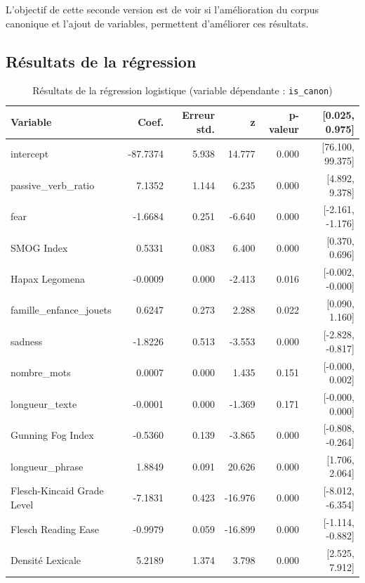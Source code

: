 \documentclass[12pt,a4paper,oneside,titlepage]{book} %
\begin{document}
L'objectif de cette seconde version est de voir si l'amélioration du corpus canonique et l'ajout de variables, permettent d'améliorer ces résultats.


\subsection{Résultats de la régression}




\begin{table}[htbp]
\centering
\caption{Résultats de la régression logistique (variable dépendante : \texttt{is\_canon})}
\begin{tabular}{lrrrrr}
\toprule
\textbf{Variable} & \textbf{Coef.} & \textbf{Erreur std.} & \textbf{z} & \textbf{p-valeur} & \textbf{[0.025, 0.975]} \\
\midrule
intercept                        & -87.7374 & 5.938  & 14.777 & 0.000 & [76.100, 99.375] \\
passive\_verb\_ratio         & 7.1352  & 1.144  & 6.235  & 0.000 & [4.892, 9.378] \\
fear                         & -1.6684 & 0.251  & -6.640 & 0.000 & [-2.161, -1.176] \\
SMOG Index                   & 0.5331  & 0.083  & 6.400  & 0.000 & [0.370, 0.696] \\
Hapax Legomena               & -0.0009 & 0.000  & -2.413 & 0.016 & [-0.002, -0.000] \\
famille\_enfance\_jouets     & 0.6247  & 0.273  & 2.288  & 0.022 & [0.090, 1.160] \\
sadness                      & -1.8226 & 0.513  & -3.553 & 0.000 & [-2.828, -0.817] \\
nombre\_mots                 & 0.0007  & 0.000  & 1.435  & 0.151 & [-0.000, 0.002] \\
longueur\_texte              & -0.0001 & 0.000  & -1.369 & 0.171 & [-0.000, 0.000] \\
Gunning Fog Index            & -0.5360 & 0.139  & -3.865 & 0.000 & [-0.808, -0.264] \\
longueur\_phrase             & 1.8849  & 0.091  & 20.626 & 0.000 & [1.706, 2.064] \\
Flesch-Kincaid Grade Level   & -7.1831 & 0.423  & -16.976& 0.000 & [-8.012, -6.354] \\
Flesch Reading Ease          & -0.9979 & 0.059  & -16.899& 0.000 & [-1.114, -0.882] \\
Densité Lexicale             & 5.2189  & 1.374  & 3.798  & 0.000 & [2.525, 7.912] \\

\end{tabular}
\end{table}
\end{document}
